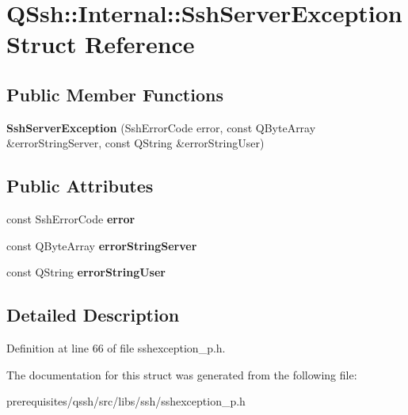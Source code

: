\hypertarget{struct_q_ssh_1_1_internal_1_1_ssh_server_exception}{}\section{Q\+Ssh\+:\+:Internal\+:\+:Ssh\+Server\+Exception Struct Reference}
\label{struct_q_ssh_1_1_internal_1_1_ssh_server_exception}
\subsection*{Public Member Functions}
\begin{DoxyCompactItemize}
\item 
\mbox{\label{struct_q_ssh_1_1_internal_1_1_ssh_server_exception_af4977fe2c260e29576d13b71e57cb339}} 
{\bfseries Ssh\+Server\+Exception} (Ssh\+Error\+Code error, const Q\+Byte\+Array \&error\+String\+Server, const Q\+String \&error\+String\+User)
\end{DoxyCompactItemize}
\subsection*{Public Attributes}
\begin{DoxyCompactItemize}
\item 
\mbox{\label{struct_q_ssh_1_1_internal_1_1_ssh_server_exception_a3b1d28775931e90c64f56730b4a6e8e0}} 
const Ssh\+Error\+Code {\bfseries error}
\item 
\mbox{\label{struct_q_ssh_1_1_internal_1_1_ssh_server_exception_a14972c943d2446dc8bc3dbf6ba96a8e2}} 
const Q\+Byte\+Array {\bfseries error\+String\+Server}
\item 
\mbox{\label{struct_q_ssh_1_1_internal_1_1_ssh_server_exception_a5041ca35c9e2219e4a252c16296b5899}} 
const Q\+String {\bfseries error\+String\+User}
\end{DoxyCompactItemize}


\subsection{Detailed Description}


Definition at line 66 of file sshexception\+\_\+p.\+h.



The documentation for this struct was generated from the following file\+:\begin{DoxyCompactItemize}
\item 
prerequisites/qssh/src/libs/ssh/sshexception\+\_\+p.\+h\end{DoxyCompactItemize}
